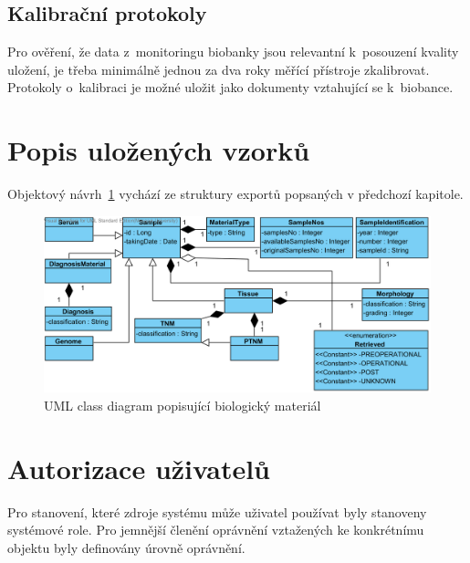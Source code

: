 \documentclass[11pt,draft,oneside]{fithesis2}
\begin{document}
\subsection{Kalibrační protokoly}
Pro ověření, že data z~monitoringu biobanky jsou relevantní k~posouzení kvality uložení, je třeba minimálně jednou za dva roky měřící přístroje zkalibrovat. Protokoly o~kalibraci je možné uložit jako dokumenty vztahující se k~biobance.


\section{Popis uložených vzorků}
Objektový návrh~\ref{fig:index:uml:class:sample} vychází ze struktury exportů popsaných v předchozí kapitole.

\begin{figure}[h!]
\begin{center}
	\includegraphics[width=\textwidth]{SampleView}
\caption{UML class diagram popisující biologický materiál}
\label{fig:index:uml:class:sample}
\end{center}
\end{figure}


\section{Autorizace uživatelů}
Pro stanovení, které zdroje systému může uživatel používat byly stanoveny systémové role. Pro jemnější členění oprávnění vztažených ke konkrétnímu objektu byly definovány úrovně oprávnění.
\end{document}
